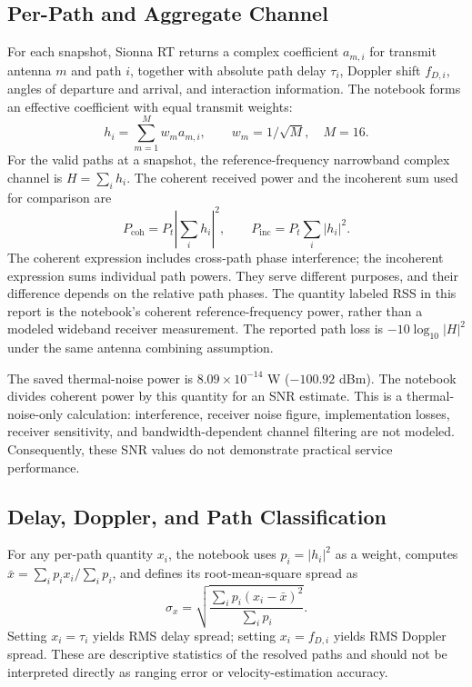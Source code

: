 \documentclass[conference]{IEEEtran}
\begin{document}
\subsection{Per-Path and Aggregate Channel}
For each snapshot, Sionna RT returns a complex coefficient $a_{m,i}$ for transmit antenna $m$ and path $i$, together with absolute path delay $\tau_i$, Doppler shift $f_{D,i}$, angles of departure and arrival, and interaction information. The notebook forms an effective coefficient with equal transmit weights:
\begin{equation}
h_i=\sum_{m=1}^{M} w_m a_{m,i},\qquad w_m=1/\sqrt{M},\quad M=16.
\label{eq:combine}
\end{equation}
For the valid paths at a snapshot, the reference-frequency narrowband complex channel is $H=\sum_i h_i$. The coherent received power and the incoherent sum used for comparison are
\begin{equation}
P_{\mathrm{coh}}=P_t\left|\sum_i h_i\right|^2,\qquad
P_{\mathrm{inc}}=P_t\sum_i |h_i|^2.
\label{eq:power}
\end{equation}
The coherent expression includes cross-path phase interference; the incoherent expression sums individual path powers. They serve different purposes, and their difference depends on the relative path phases. The quantity labeled RSS in this report is the notebook's coherent reference-frequency power, rather than a modeled wideband receiver measurement. The reported path loss is $-10\log_{10}|H|^2$ under the same antenna combining assumption.

The saved thermal-noise power is $8.09\times10^{-14}$ W ($-100.92$ dBm). The notebook divides coherent power by this quantity for an SNR estimate. This is a thermal-noise-only calculation: interference, receiver noise figure, implementation losses, receiver sensitivity, and bandwidth-dependent channel filtering are not modeled. Consequently, these SNR values do not demonstrate practical service performance.

\subsection{Delay, Doppler, and Path Classification}
For any per-path quantity $x_i$, the notebook uses $p_i=|h_i|^2$ as a weight, computes $\bar{x}=\sum_i p_i x_i/\sum_i p_i$, and defines its root-mean-square spread as
\begin{equation}
\sigma_x=\sqrt{\frac{\sum_i p_i(x_i-\bar{x})^2}{\sum_i p_i}}.
\label{eq:spread}
\end{equation}
Setting $x_i=\tau_i$ yields RMS delay spread; setting $x_i=f_{D,i}$ yields RMS Doppler spread. These are descriptive statistics of the resolved paths and should not be interpreted directly as ranging error or velocity-estimation accuracy.
\end{document}

